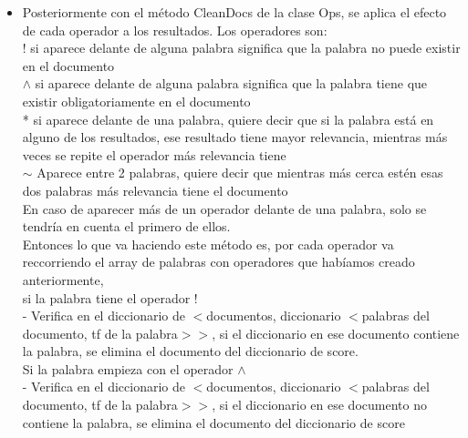 \documentclass[12pt, a4paper]{article}
\begin{document}
\begin{enumerate}
\begin{itemize}
                  \item Posteriormente con el método CleanDocs de la clase Ops,
                        se aplica el efecto de cada operador a los resultados. Los operadores son:\\
                        ! si aparece delante de alguna palabra significa que la palabra
                        no puede existir en el documento\\
                        $\wedge$ si aparece delante de alguna palabra significa que la palabra tiene
                        que existir obligatoriamente en el documento\\
                        * si aparece delante de una palabra, quiere decir que si la palabra está
                        en alguno de los resultados, ese resultado tiene mayor relevancia,
                        mientras más veces se repite el operador más relevancia tiene\\
                        $\sim$ Aparece entre 2 palabras, quiere decir que mientras más cerca estén esas
                        dos palabras más relevancia tiene el documento\\
                        En caso de aparecer más de un operador delante de una palabra,
                        solo se tendría en cuenta el primero de ellos.\\
                        Entonces lo que va haciendo este método es, por cada operador va reccorriendo
                        el array de palabras con operadores que habíamos creado anteriormente, \\

                        si la palabra tiene el operador !\\
                        - Verifica en el diccionario de
                        $<$documentos, diccionario $<$palabras del documento, tf de la palabra$>>$,
                        si el diccionario en ese documento contiene la palabra,
                        se elimina el documento del diccionario de score.\\

                        Si la palabra empieza con el operador $\wedge$\\
                        - Verifica en el diccionario de
                        $<$documentos, diccionario $<$palabras del documento, tf de la palabra$>>$,
                        si el diccionario en ese documento no contiene la palabra,
                        se elimina el documento del diccionario de score\\


\end{itemize}
\end{enumerate}
\end{document}
